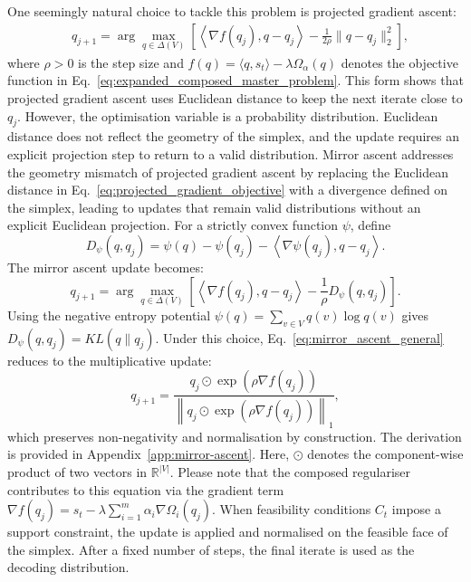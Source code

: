 \documentclass{article} %
\begin{document}
One seemingly natural choice to tackle this problem is projected gradient ascent:
\begin{align}\label{eq:projected_gradient_objective}
    &q_{j+1}
=
\arg\max_{q\in\Delta(V)}
\left[
\left\langle \nabla f(q_j),q-q_j\right\rangle
-
\frac{1}{2\rho}
\|q-q_j\|_2^2
\right],
\end{align}
where $\rho>0$ is the step size and $f(q) =
\langle q,s_t\rangle
-
\lambda\Omega_\alpha(q)$ denotes the objective function in Eq.~\ref{eq:expanded_composed_master_problem}. This form shows that projected gradient ascent uses Euclidean distance to keep the next iterate close to $q_j$. However, the optimisation variable is a probability distribution. Euclidean distance does not reflect the geometry of the simplex, and the update requires an explicit projection step to return to a valid distribution. Mirror ascent addresses the geometry mismatch of projected gradient ascent by replacing the Euclidean distance in Eq.~\ref{eq:projected_gradient_objective} with a divergence defined on the simplex, leading to updates that remain valid distributions without an explicit Euclidean projection. 
For a strictly convex function $\psi$, define
\begin{equation}
D_\psi(q,q_j)
=
\psi(q)
-
\psi(q_j)
-
\left\langle
\nabla\psi(q_j),q-q_j
\right\rangle .
\label{eq:bregman_divergence}
\end{equation}
The mirror ascent update becomes:
\begin{equation}
q_{j+1}
=
\arg\max_{q\in\Delta(V)}
\left[
\left\langle \nabla f(q_j),q-q_j\right\rangle
-
\frac{1}{\rho}
D_\psi(q,q_j)
\right].
\label{eq:mirror_ascent_general}
\end{equation}
Using the negative entropy potential $\psi(q)=\sum_{v\in V}q(v)\log q(v)$ gives $D_\psi(q,q_j)=KL(q\|q_j)$.
Under this choice, Eq.~\ref{eq:mirror_ascent_general} reduces to the multiplicative update:
\begin{equation}
q_{j+1}
=
\frac{
q_j\odot \exp\left(\rho\nabla f(q_j)\right)
}{
\left\|
q_j\odot \exp\left(\rho\nabla f(q_j)\right)
\right\|_1
},
\label{eq:mirror_ascent_update}
\end{equation}
which preserves non-negativity and normalisation by construction. The derivation is provided in Appendix~\ref{app:mirror-ascent}. Here, $\odot$ denotes the component-wise product of two vectors in $\mathbb{R}^{|V|}$. Please note that the composed regulariser contributes to this equation via the gradient term $\nabla f(q_j)
=
s_t
-
\lambda
\sum_{i=1}^{m}\alpha_i\nabla\Omega_i(q_j).$ When feasibility conditions $C_t$ impose a support constraint, the update is applied and normalised on the feasible face of the simplex. After a fixed number of steps, the final iterate is used as the decoding distribution.
\end{document}
